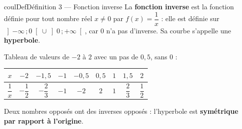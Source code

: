 \documentclass[11pt,a4paper]{article}
\makeatletter
\newcommand{\lycee@repere}[4]{%
  \draw[grille,step=1] (#1,#2) grid (#3,#4);
  \draw[-{Stealth[length=2mm]},thick] (#1,0)--({#3+0.4},0) node[below left=-1pt]{$x$};
  \draw[-{Stealth[length=2mm]},thick] (0,#2)--(0,{#4+0.4}) node[below left=-1pt]{$y$};
  \node[below left,font=\scriptsize,inner sep=1.5pt] at (0,0) {$0$};}
\newcommand{\lycee@gradx}[1]{\foreach \k/\l in {#1}{%
  \draw (\k,0.07)--(\k,-0.07) node[below,font=\scriptsize,inner sep=1.5pt]{$\l$};}}
\newcommand{\lycee@grady}[1]{\foreach \k/\l in {#1}{%
  \draw (0.07,\k)--(-0.07,\k) node[left,font=\scriptsize,inner sep=1.5pt]{$\l$};}}
\newcommand{\lycee@intoo}[2]{\left]#1\,;#2\right[}
\providecommand{\repere}{\lycee@repere}%
\providecommand{\gradx}{\lycee@gradx}%
\providecommand{\grady}{\lycee@grady}%
\providecommand{\intoo}{\lycee@intoo}%
\newcounter{lycee@signet}
\newcommand{\signet}[3][]{\stepcounter{lycee@signet}%
  \edef\lycee@dest{\if\relax\detokenize{#1}\relax
    signet.\arabic{lycee@signet}\else#1\fi}%
  \hypertarget{\lycee@dest}{}\bookmark[level=#2,dest=\lycee@dest]{#3}}
\newenvironment{definitionbox}[1][Définition]%
  {\begin{boitecours}[phantom={\signet{2}{#1}}]{coulDef}{#1}}{\end{boitecours}}
\makeatother
\begin{document}
\begin{definitionbox}[Définition 3 --- Fonction inverse]
La \textbf{fonction inverse} est la fonction définie pour tout nombre réel $x\ne 0$ par
${f(x)=\dfrac{1}{x}}$ : elle est définie sur $\intoo{-\infty}{0}\cup\intoo{0}{+\infty}$, car
$0$ n'a pas d'inverse. Sa courbe s'appelle une \textbf{hyperbole}.

\smallskip
\begin{minipage}[c]{0.60\linewidth}\raggedright
Tableau de valeurs de $-2$ à $2$ avec un pas de $0{,}5$, sans $0$ :
\begin{center}
\renewcommand{\arraystretch}{2.4}\setlength{\tabcolsep}{4pt}
\begin{tabular}{|c|*{8}{c|}}
\hline
$x$ & $-2$ & $-1{,}5$ & $-1$ & $-0{,}5$ & $0{,}5$ & $1$ & $1{,}5$ & $2$\\\hline
$\dfrac{1}{x}$ & $-\dfrac12$ & $-\dfrac23$ & $-1$ & $-2$ & $2$ & $1$ & $\dfrac23$
  & $\dfrac12$\\\hline
\end{tabular}
\end{center}
Deux nombres opposés ont des inverses opposés : l'hyperbole est
\textbf{symétrique par rapport à l'origine}.
\end{minipage}\hfill
\begin{minipage}[c]{0.36\linewidth}\centering
{}
\end{minipage}
\end{definitionbox}
\end{document}
